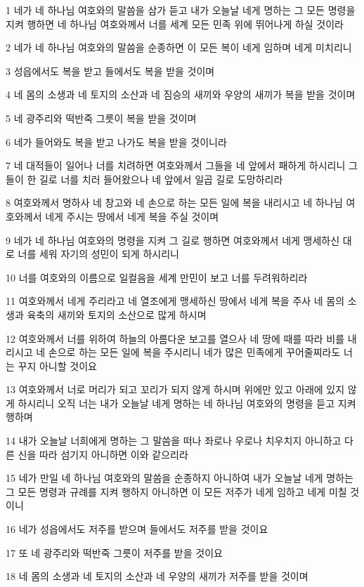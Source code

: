\par 1 네가 네 하나님 여호와의 말씀을 삼가 듣고 내가 오늘날 네게 명하는 그 모든 명령을 지켜 행하면 네 하나님 여호와께서 너를 세계 모든 민족 위에 뛰어나게 하실 것이라
\par 2 네가 네 하나님 여호와의 말씀을 순종하면 이 모든 복이 네게 임하며 네게 미치리니
\par 3 성읍에서도 복을 받고 들에서도 복을 받을 것이며
\par 4 네 몸의 소생과 네 토지의 소산과 네 짐승의 새끼와 우양의 새끼가 복을 받을 것이며
\par 5 네 광주리와 떡반죽 그릇이 복을 받을 것이며
\par 6 네가 들어와도 복을 받고 나가도 복을 받을 것이니라
\par 7 네 대적들이 일어나 너를 치려하면 여호와께서 그들을 네 앞에서 패하게 하시리니 그들이 한 길로 너를 치러 들어왔으나 네 앞에서 일곱 길로 도망하리라
\par 8 여호와께서 명하사 네 창고와 네 손으로 하는 모든 일에 복을 내리시고 네 하나님 여호와께서 네게 주시는 땅에서 네게 복을 주실 것이며
\par 9 네가 네 하나님 여호와의 명령을 지켜 그 길로 행하면 여호와께서 네게 맹세하신 대로 너를 세워 자기의 성민이 되게 하시리니
\par 10 너를 여호와의 이름으로 일컬음을 세계 만민이 보고 너를 두려워하리라
\par 11 여호와께서 네게 주리라고 네 열조에게 맹세하신 땅에서 네게 복을 주사 네 몸의 소생과 육축의 새끼와 토지의 소산으로 많게 하시며
\par 12 여호와께서 너를 위하여 하늘의 아름다운 보고를 열으사 네 땅에 때를 따라 비를 내리시고 네 손으로 하는 모든 일에 복을 주시리니 네가 많은 민족에게 꾸어줄찌라도 너는 꾸지 아니할 것이요
\par 13 여호와께서 너로 머리가 되고 꼬리가 되지 않게 하시며 위에만 있고 아래에 있지 않게 하시리니 오직 너는 내가 오늘날 네게 명하는 네 하나님 여호와의 명령을 듣고 지켜 행하며
\par 14 내가 오늘날 너희에게 명하는 그 말씀을 떠나 좌로나 우로나 치우치지 아니하고 다른 신을 따라 섬기지 아니하면 이와 같으리라
\par 15 네가 만일 네 하나님 여호와의 말씀을 순종하지 아니하여 내가 오늘날 네게 명하는 그 모든 명령과 규례를 지켜 행하지 아니하면 이 모든 저주가 네게 임하고 네게 미칠 것이니
\par 16 네가 성읍에서도 저주를 받으며 들에서도 저주를 받을 것이요
\par 17 또 네 광주리와 떡반죽 그릇이 저주를 받을 것이요
\par 18 네 몸의 소생과 네 토지의 소산과 네 우양의 새끼가 저주를 받을 것이며
